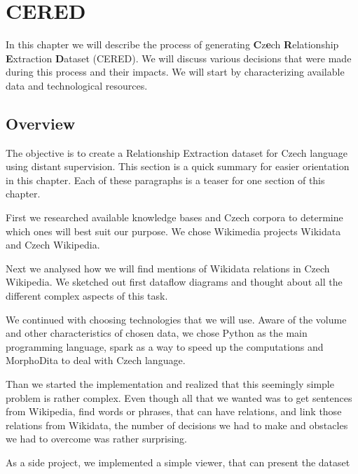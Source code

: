 \chapter{CERED}

In this chapter we will describe the process of generating \textbf{C}z\textbf{e}ch \textbf{R}elationship \textbf{E}xtraction \textbf{D}ataset (CERED). We will discuss various decisions that were made during this process and their impacts. 
We will start by characterizing available data and technological resources. 





\section{Overview}

The objective is to create a Relationship Extraction dataset for Czech language using distant supervision. This section is a quick summary for easier orientation in this chapter. Each of these paragraphs is a teaser for one section of this chapter.

First we researched available knowledge bases and Czech corpora to determine which ones will best suit our purpose. We chose Wikimedia projects Wikidata and Czech Wikipedia. 

Next we analysed how we will find mentions of Wikidata relations in Czech Wikipedia. We sketched out first dataflow diagrams and thought about all the different complex aspects of this task.

We continued with choosing technologies that we will use. Aware of the volume and other characteristics of chosen data, we chose Python as the main programming language, spark as a way to speed up the computations and MorphoDita to deal with Czech language. 

Than we started the implementation and realized that this seemingly simple problem is rather complex. Even though all that we wanted was to get sentences from Wikipedia, find words or phrases, that can have relations, and link those relations from Wikidata, the number of decisions we had to make and obstacles we had to overcome was rather surprising.

As a side project, we implemented a simple viewer, that can present the dataset




